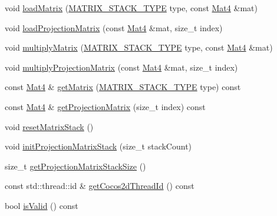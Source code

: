 \begin{DoxyCompactItemize}
\item 
void \hyperlink{classDirector_a95ecc03e54db47241c59ad68c4eb9ec2}{load\+Matrix} (\hyperlink{group__base_ga4d146cef7130a8f3a953d46964ea3905}{M\+A\+T\+R\+I\+X\+\_\+\+S\+T\+A\+C\+K\+\_\+\+T\+Y\+PE} type, const \hyperlink{classMat4}{Mat4} \&mat)
\item 
void \hyperlink{classDirector_aafa89a3617de480ba2370294fb2f809c}{load\+Projection\+Matrix} (const \hyperlink{classMat4}{Mat4} \&mat, size\+\_\+t index)
\item 
void \hyperlink{classDirector_aec8693e208a9eeb95de9b4c6af300444}{multiply\+Matrix} (\hyperlink{group__base_ga4d146cef7130a8f3a953d46964ea3905}{M\+A\+T\+R\+I\+X\+\_\+\+S\+T\+A\+C\+K\+\_\+\+T\+Y\+PE} type, const \hyperlink{classMat4}{Mat4} \&mat)
\item 
void \hyperlink{classDirector_ad54a2ecc7e0d4f15388350954aaf4d6f}{multiply\+Projection\+Matrix} (const \hyperlink{classMat4}{Mat4} \&mat, size\+\_\+t index)
\item 
const \hyperlink{classMat4}{Mat4} \& \hyperlink{classDirector_affe74971c575a355c5fe98fad47c3398}{get\+Matrix} (\hyperlink{group__base_ga4d146cef7130a8f3a953d46964ea3905}{M\+A\+T\+R\+I\+X\+\_\+\+S\+T\+A\+C\+K\+\_\+\+T\+Y\+PE} type) const
\item 
const \hyperlink{classMat4}{Mat4} \& \hyperlink{classDirector_ada87fe90413c1c1045b705009969aaa8}{get\+Projection\+Matrix} (size\+\_\+t index) const
\item 
void \hyperlink{classDirector_a1227205af91f2bc56f25fb9c5f0439bd}{reset\+Matrix\+Stack} ()
\item 
void \hyperlink{classDirector_a82d147e44c0e54adbc65560371de6328}{init\+Projection\+Matrix\+Stack} (size\+\_\+t stack\+Count)
\item 
size\+\_\+t \hyperlink{classDirector_aa8f831f8e9272790b8d1efdc3726cf12}{get\+Projection\+Matrix\+Stack\+Size} ()
\item 
const std\+::thread\+::id \& \hyperlink{classDirector_a582225969ce1f42224c0387779f875e1}{get\+Cocos2d\+Thread\+Id} () const
\item 
bool \hyperlink{classDirector_ac302214e1e2f245e70d2e22905829fba}{is\+Valid} () const
\end{DoxyCompactItemize}
